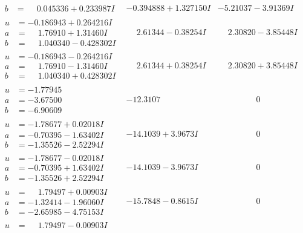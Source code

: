 \documentclass[1p]{elsarticle_modified}
\theoremstyle{definition}
\begin{document}
$$\begin{array}{c|c|c}
\begin{aligned}
b &= \phantom{-}0.045336 + 0.233987 I\end{aligned}
 & -0.394888 + 1.327150 I & -5.21037 - 3.91369 I \\ \hline\begin{aligned}
u &= -0.186943 + 0.264216 I \\
a &= \phantom{-}1.76910 + 1.31460 I \\
b &= \phantom{-}1.040340 - 0.428302 I\end{aligned}
 & \phantom{-}2.61344 - 0.38254 I & \phantom{-}2.30820 - 3.85448 I \\ \hline\begin{aligned}
u &= -0.186943 - 0.264216 I \\
a &= \phantom{-}1.76910 - 1.31460 I \\
b &= \phantom{-}1.040340 + 0.428302 I\end{aligned}
 & \phantom{-}2.61344 + 0.38254 I & \phantom{-}2.30820 + 3.85448 I \\ \hline\begin{aligned}
u &= -1.77945\phantom{ +0.000000I} \\
a &= -3.67500\phantom{ +0.000000I} \\
b &= -6.90609\phantom{ +0.000000I}\end{aligned}
 & -12.3107\phantom{ +0.000000I} & \phantom{-0.000000 } 0 \\ \hline\begin{aligned}
u &= -1.78677 + 0.02018 I \\
a &= -0.70395 - 1.63402 I \\
b &= -1.35526 - 2.52294 I\end{aligned}
 & -14.1039 + 3.9673 I & \phantom{-0.000000 } 0 \\ \hline\begin{aligned}
u &= -1.78677 - 0.02018 I \\
a &= -0.70395 + 1.63402 I \\
b &= -1.35526 + 2.52294 I\end{aligned}
 & -14.1039 - 3.9673 I & \phantom{-0.000000 } 0 \\ \hline\begin{aligned}
u &= \phantom{-}1.79497 + 0.00903 I \\
a &= -1.32414 - 1.96060 I \\
b &= -2.65985 - 4.75153 I\end{aligned}
 & -15.7848 - 0.8615 I & \phantom{-0.000000 } 0 \\ \hline\begin{aligned}
u &= \phantom{-}1.79497 - 0.00903 I \\

\end{aligned}
\end{array}$$
\end{document}
